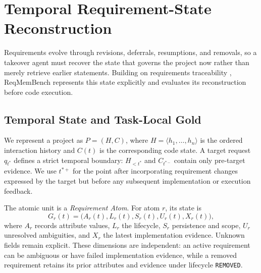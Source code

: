 \documentclass{article} %
\begin{document}


\section{Temporal Requirement-State Reconstruction}
\label{sec:formulation}

Requirements evolve through revisions, deferrals, resumptions, and removals, so a takeover agent must recover the state that governs the project now rather than merely retrieve earlier statements. Building on requirements traceability \citep{nuseibeh2000requirements,gotel1994analysis}, ReqMemBench represents this state explicitly and evaluates its reconstruction before code execution.

\subsection{Temporal State and Task-Local Gold}

We represent a project as $P=(H,C)$, where $H=\langle h_1,\ldots,h_n\rangle$ is the ordered interaction history and $C(t)$ is the corresponding code state. A target request $q_{t^*}$ defines a strict temporal boundary: $H_{<t^*}$ and $C_{t^{*-}}$ contain only pre-target evidence. We use $t^{*+}$ for the point after incorporating requirement changes expressed by the target but before any subsequent implementation or execution feedback.

The atomic unit is a \emph{Requirement Atom}. For atom $r$, its state is
\begin{equation}
G_r(t)=\bigl(A_r(t),L_r(t),S_r(t),U_r(t),X_r(t)\bigr),
\label{eq:requirement-state}
\end{equation}
where $A_r$ records attribute values, $L_r$ the lifecycle, $S_r$ persistence and scope, $U_r$ unresolved ambiguities, and $X_r$ the latest implementation evidence. Unknown fields remain explicit. These dimensions are independent: an active requirement can be ambiguous or have failed implementation evidence, while a removed requirement retains its prior attributes and evidence under lifecycle \texttt{REMOVED}.
\end{document}
